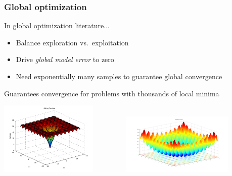 \documentclass[aspectratio=169]{beamer}
\begin{document}
%
%

\begin{frame}
\frametitle{Global optimization}
In global optimization literature...
\begin{itemize}
\item Balance exploration vs.\ exploitation
\item Drive {\sl global model error} to zero
\item Need exponentially many samples to guarantee global convergence
\end{itemize}

Guarantees convergence for problems with thousands of local minima

\begin{center}
\includegraphics[width=0.35\textwidth]{../img/moo_new/ackley.png}
$\qquad\qquad$
\includegraphics[width=0.4\textwidth]{../img/moo_new/rastrigin.png}
\end{center}

\end{frame}
\end{document}
